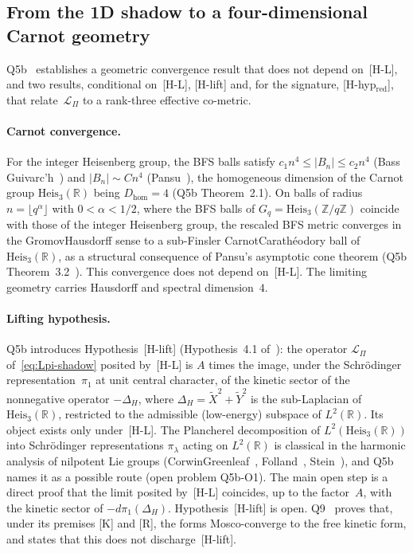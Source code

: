 \documentclass[11pt,a4paper]{article}
\begin{document}
  \subsection{From the 1D shadow to a four-dimensional Carnot geometry}
    \label{sec:q5b}

    Q5b~\cite{Beau2026q5b} establishes a geometric convergence result that does not depend on~[H-L], and two results,
    conditional on~[H-L], [H-lift] and, for the signature, [H-hyp$_{\mathrm{red}}$], that relate~$\mathcal{L}_\Pi$ to
    a rank-three effective co-metric.

    \paragraph{Carnot convergence.}
      For the integer Heisenberg group, the BFS balls satisfy $c_1 n^4 \le |B_n| \le c_2 n^4$ (Bass\textendash
      Guivarc'h~\cite{Bass1972,Guivarch1973}) and $|B_n| \sim C n^4$ (Pansu~\cite{Pansu1983}), the homogeneous dimension
      of the Carnot group $\mathrm{Heis}_3(\mathbb{R})$ being $D_{\mathrm{hom}} = 4$ (Q5b Theorem~2.1).
      On balls of radius $n = \lfloor q^\alpha \rfloor$ with $0 < \alpha < 1/2$, where the BFS balls of
      $G_q = \mathrm{Heis}_3(\mathbb{Z}/q\mathbb{Z})$ coincide with those of the integer Heisenberg group, the rescaled
      BFS metric converges in the Gromov\textendash Hausdorff sense to a sub-Finsler Carnot\textendash Carath\'eodory
      ball of $\mathrm{Heis}_3(\mathbb{R})$, as a structural consequence of Pansu's asymptotic cone theorem (Q5b
      Theorem~3.2~\cite{Beau2026q5b}).
      This convergence does not depend on~[H-L].
      The limiting geometry carries Hausdorff and spectral dimension~$4$.

    \paragraph{Lifting hypothesis.}
      Q5b introduces Hypothesis~[H-lift] (Hypothesis~4.1 of~\cite{Beau2026q5b}): the operator $\mathcal{L}_\Pi$
      of~\eqref{eq:Lpi-shadow} posited by~[H-L] is $A$ times the image, under the Schr\"odinger representation~$\pi_1$
      at unit central character, of the kinetic sector of the nonnegative operator $-\Delta_H$, where
      $\Delta_H = \widetilde{X}^2 + \widetilde{Y}^2$ is the sub-Laplacian of $\mathrm{Heis}_3(\mathbb{R})$, restricted
      to the admissible (low-energy) subspace of $L^2(\mathbb{R})$.
      Its object exists only under~[H-L].
      The Plancherel decomposition of $L^2(\mathrm{Heis}_3(\mathbb{R}))$ into Schr\"odinger representations
      $\pi_\lambda$ acting on $L^2(\mathbb{R})$ is classical in the harmonic analysis of nilpotent Lie groups
      (Corwin\textendash Greenleaf~\cite{CorwinGreenleaf1990}, Folland~\cite{Folland1989}, Stein~\cite{Stein1993}), and
      Q5b names it as a possible route (open problem Q5b-O1).
      The main open step is a direct proof that the limit posited by~[H-L] coincides, up to the factor~$A$, with the
      kinetic sector of $-d\pi_1(\Delta_H)$.
      Hypothesis~[H-lift] is open.
      Q9~\cite{Beau2026q9} proves that, under its premises [K] and [R], the forms Mosco-converge to the free kinetic
      form, and states that this does not discharge~[H-lift].
\end{document}
